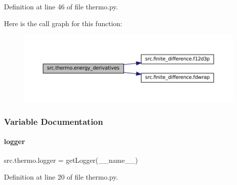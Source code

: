 Definition at line 46 of file thermo.\+py.

Here is the call graph for this function\+:
\nopagebreak
\begin{figure}[H]
\begin{center}
\leavevmode
\includegraphics[width=350pt]{namespacesrc_1_1thermo_a3aaa182f02560e7270d90bd0030ab8e6_cgraph}
\end{center}
\end{figure}


\subsubsection{Variable Documentation}
\mbox{\label{namespacesrc_1_1thermo_a3bb9aec3ed44b9a4a826e9c93a2a312c}} 
\paragraph{\texorpdfstring{logger}{logger}}
{\footnotesize\ttfamily src.\+thermo.\+logger = get\+Logger(\+\_\+\+\_\+name\+\_\+\+\_\+)}



Definition at line 20 of file thermo.\+py.


